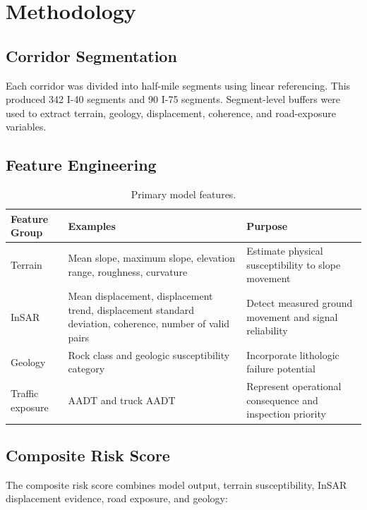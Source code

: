 \documentclass[11pt,letterpaper]{article}
\begin{document}
\section{Methodology}
\label{sec:methods}

\subsection{Corridor Segmentation}

Each corridor was divided into half-mile segments using linear referencing. This produced 342 I-40 segments and 90 I-75 segments. Segment-level buffers were used to extract terrain, geology, displacement, coherence, and road-exposure variables.

\subsection{Feature Engineering}

\begin{table}[H]
\centering
\caption{Primary model features.}
\label{tab:features}
\begin{tabularx}{\linewidth}{L{3.6cm}L{4.2cm}Y}
\toprule
\textbf{Feature Group} &
\textbf{Examples} &
\textbf{Purpose} \\
\midrule
Terrain & Mean slope, maximum slope, elevation range, roughness, curvature & Estimate physical susceptibility to slope movement \\
InSAR & Mean displacement, displacement trend, displacement standard deviation, coherence, number of valid pairs & Detect measured ground movement and signal reliability \\
Geology & Rock class and geologic susceptibility category & Incorporate lithologic failure potential \\
Traffic exposure & AADT and truck AADT & Represent operational consequence and inspection priority \\
\bottomrule
\end{tabularx}
\end{table}

\subsection{Composite Risk Score}

The composite risk score combines model output, terrain susceptibility, InSAR displacement evidence, road exposure, and geology:
\end{document}
